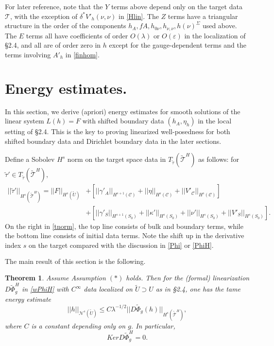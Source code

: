 \documentclass[10pt]{amsart}
\newcommand{\g}{\gamma}
\renewcommand{\d}{\delta}
\newcommand{\e}{\varepsilon}
\newcommand{\Si}{\Sigma}
\renewcommand{\k}{\kappa}
\renewcommand{\l}{\lambda}
\newcommand{\cC}{{\mathcal C}}
\newcommand{\cT}{{\mathcal T}}
\newcommand{\cN}{{\mathcal N}}
\newcommand{\be}{\begin{equation}}
\newcommand{\ee}{\end{equation}}
\newcommand{\<}{\langle}
\renewcommand{\>}{\rangle}
\newcommand{\w}{\widetilde}
\theoremstyle{plain}
\newtheorem{theorem}[lemma]{Theorem}
\theoremstyle{remark}
\theoremstyle{definition}
\numberwithin{equation}{section}
\begin{document}
    For later reference, note that the $Y$ terms above depend only on the target data $\cT$, with the exception of $\d^*V'_h(\nu, \nu)$ in \eqref{Hlin}. 
The $Z$ terms have a triangular structure in the order of the components $h_A, fA, h_{0\nu}, h_{\nu, \nu}, h(\nu)^{\Si}$ used above. The $E$ terms all have 
coefficients of order $O(\l)$ or $O(\e)$ in the localization of \S 2.4, and all are of order zero in $h$ except for the gauge-dependent terms and the terms 
involving $A'_h$ in \eqref{finhom}. 
 
\section{Energy estimates.}


   In this section, we derive (apriori) energy estimates for smooth solutions of the linear system $L(h) = F$ with shifted boundary data 
$(h_A, \eta_h)$  in the local setting of \S 2.4. This is the key to proving linearized well-posedness for both shifted boundary data and 
Dirichlet boundary data in the later sections. 

\smallskip 

  Define a Sobolev $H^s$ norm on the target space data in $T_{\w \tau}(\w \cT^H)$ as follows: for $\w \tau' \in T_{\w \tau}(\w \cT^H)$,   
\be \label{tnorm}
\begin{split}
||\w \tau'||_{H^s(\w \cT^H)} = ||F||_{H^s(\w U)} & + [ ||\g'_A||_{H^{s+1}(\cC)} + ||\eta||_{H^{s}(\cC)} + ||V'_{\cC}||_{H^s(\cC)}] \\
& + [ ||\g'_S||_{H^{s+1}(S_0)} + ||\k'||_{H^{s}(S_0)} + ||\nu'||_{H^s(S_0)} + ||V'_S||_{H^s(S_0)} ].
\end{split}
\ee
 On the right in \eqref{tnorm}, the top line consists of bulk and boundary terms, while the bottom line consists of initial data terms. Note the shift up in the 
derivative index $s$ on the target compared with the discussion in \eqref{Phi} or \eqref{PhiH}. 
 
  The main result of this section is the following.

\begin{theorem} \label{Eestthm} 
  Assume Assumption $(*)$ holds. Then for the (formal) linearization $D\w \Phi_g^H$ in \eqref{wPhiH} with $C^{\infty}$ data localized on $\w U \supset U$ 
as in \S 2.4, one has the tame energy estimate 
\be \label{Eest}
||h||_{\cN^s(\w U)}  \leq C \l^{-1/2}||D\w \Phi_g(h)||_{H^s(\w \cT^H)},
\ee
where $C$ is a constant depending only on $g$. In particular, 
$$Ker D\w \Phi_g^H = 0.$$
\end{theorem} 
\end{document}
